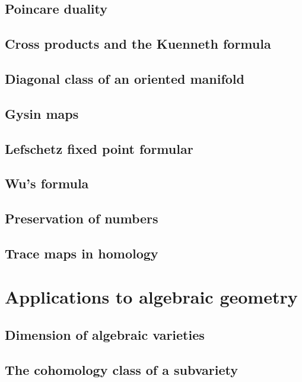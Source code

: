 \documentclass[5pt]{article}
\theoremstyle{definition}
\theoremstyle{remark}
\begin{document}
	\subsection{Poincare duality}
	
	\subsection{Cross products and the Kuenneth formula}
	
	\subsection{Diagonal class of an oriented manifold}
	
	\subsection{Gysin maps}
	
	\subsection{Lefschetz fixed point formular}
	
	\subsection{Wu's formula}
	
	\subsection{Preservation of numbers}
	
	\subsection{Trace maps in homology}
	
	\newpage
	
	\section{Applications to algebraic geometry}
	
	\subsection{Dimension of algebraic varieties}
	
	\subsection{The cohomology class of a subvariety}
	
\end{document}
